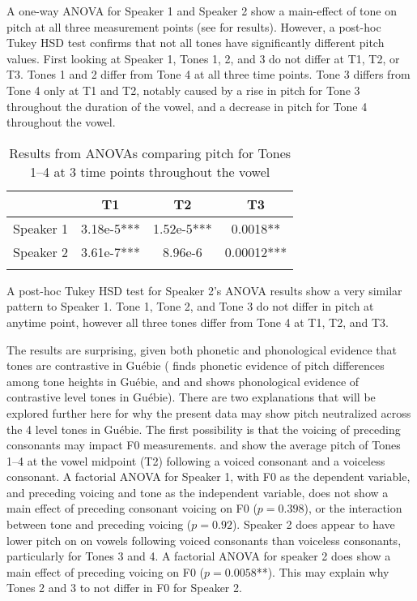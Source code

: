 \documentclass[output=paper]{langscibook}
\begin{document}
A one-way ANOVA for Speaker 1 and Speaker 2 show a main-effect of tone on pitch at all three measurement points (see  for results). However, a post-hoc Tukey HSD test confirms that not all tones have significantly different pitch values. First looking at Speaker 1, Tones 1, 2, and 3 do not differ at T1, T2, or T3. Tones 1 and 2 differ from Tone 4 at all three time points. Tone 3 differs from Tone 4 only at T1 and T2, notably caused by a rise in pitch for Tone 3 throughout the duration of the vowel, and a decrease in pitch for Tone 4 throughout the vowel.

\begin{table}
\caption{Results from ANOVAs comparing pitch for Tones 1--4 at 3 time points throughout the vowel}
\label{tab:oakley:GueToneAnova}
\begin{tabular}{l *{2}{S[table-align-text-post=false,table-format=1.2e-1{***}]} S[table-align-text-post=false,table-format=1.5{***}]}
 \lsptoprule
 & {T1} & {T2} & {T3} \\
 \midrule
Speaker 1 & 3.18e-5*** & 1.52e-5*** & 0.0018**  \\ 
Speaker 2 & 3.61e-7*** & 8.96e-6 & 0.00012***  \\ 
\lspbottomrule
\end{tabular}
\end{table}

A post-hoc Tukey HSD test for Speaker 2's ANOVA results show a very similar pattern to Speaker 1. Tone 1, Tone 2, and Tone 3 do not differ in pitch at anytime point, however all three tones differ from Tone 4 at T1, T2, and T3. 

The results are surprising, given both phonetic and phonological evidence that tones are contrastive in Guébie (\cite{sande2020} finds phonetic evidence of pitch differences among tone heights in Guébie, and \cite{sande2017} and \cite{sande2018cross} shows phonological evidence of contrastive level tones in Guébie). There are two explanations that will be explored further here for why the present data may show pitch neutralized across the 4 level tones in Guébie. The first possibility is that the voicing of preceding consonants may impact F0 measurements.  and  show the average pitch of Tones 1--4 at the vowel midpoint (T2) following a voiced consonant and a voiceless consonant. A factorial ANOVA for Speaker 1, with F0 as the dependent variable, and preceding voicing and tone as the independent variable, does not show a main effect of preceding consonant voicing on F0 ($p=0.398$), or the interaction between tone and preceding voicing ($p=0.92$). Speaker 2 does appear to have lower pitch on on vowels following voiced consonants than voiceless consonants, particularly for Tones 3 and 4. A factorial ANOVA for speaker 2 does show a main effect of preceding voicing on F0 ($p=0.0058$**). This may explain why Tones 2 and 3 to not differ in F0 for Speaker 2.
\end{document}
